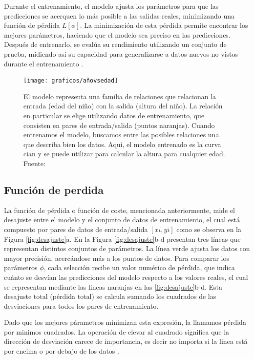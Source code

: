 	Durante el entrenamiento, el modelo ajusta los parámetros para que las predicciones se acerquen lo más posible a las salidas reales, minimizando una función de pérdida $L[\phi]$. La minimización de esta pérdida permite encontrar los mejores parámetros, haciendo que el modelo sea preciso en las predicciones. Después de entrenarlo, se evalúa su rendimiento utilizando un conjunto de prueba, midiendo así su capacidad para generalizarse a datos nuevos no vistos durante el entrenamiento \parencite{prince2023understanding}.
	
	\begin{figure}[h!]
		\centering
		\texttt{[image: graficos/añovsedad]}
		\caption[Modelo representativo de datos de entrenamiento, entrada/salida.]{El modelo representa una familia de relaciones
			que relacionan la entrada (edad del niño) con la salida (altura del niño). La relación
			en particular se elige utilizando datos de entrenamiento, que consisten en pares de entrada/salida
			(puntos naranjas). Cuando entrenamos el modelo, buscamos entre las posibles relaciones una que describa bien los datos. Aquí, el modelo entrenado es la curva
			cian y se puede utilizar para calcular la altura para cualquier edad. Fuente: \parencite{prince2023understanding}
		}
		\label{fig:añovsedad}
	\end{figure}
	
	\subsection{Función de perdida}
	
	La función de pérdida o función de coste, mencionada anteriormente, mide el desajuste entre el modelo y el conjunto de datos de entrenamiento, el cual está compuesto por pares de datos de entrada/salida $[xi, yi]$ como se observa en la Figura \ref{fig:desajuste}a. En la Figura \ref{fig:desajuste}b-d presentan tres líneas que representan distintos conjuntos de parámetros. La línea verde ajusta los datos con mayor precisión, acercándose más a los puntos de datos. Para comparar los parámetros $\phi$, cada selección recibe un valor numérico de pérdida, que indica cuánto se desvían las predicciones del modelo respecto a los valores reales, el cual se representan mediante las lineas naranjas en las \ref{fig:desajuste}b-d. Esta desajuste total (pérdida total) se calcula sumando los cuadrados de las desviaciones para todos los pares de entrenamiento.
	
	Dado que los mejores párametros minimizan esta expresión, la llamamos pérdida por minimos cuadrados. La operación de elevar al cuadrado significa que la dirección de desviación carece de importancia, es decir no importa si la linea está por encima o por debajo de los datos \parencite{prince2023understanding}. 
	

